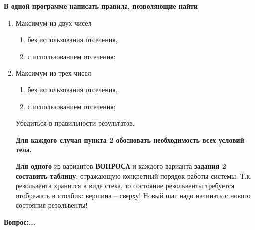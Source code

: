 \documentclass[a4paper,12pt]{article}
\begin{document}
	{\bf В одной программе написать правила, позволяющие найти}
	
	\begin{enumerate}
		\item Максимум из двух чисел
		
		\begin{enumerate}
			\item без использования отсечения,
			\item с использованием отсечения;
		\end{enumerate}
		\item Максимум из трех чисел
		
		\begin{enumerate}
			\item без использования отсечения,
			\item с использованием отсечения;
		\end{enumerate}

		Убедиться в правильности результатов.
		
		{\bf Для каждого случая пункта 2 обосновать необходимость всех условий тела.}
		
		{\bf Для одного} из вариантов {\bf ВОПРОСА} и каждого варианта {\bf задания 2 составить таблицу}, отражающую конкретный порядок работы системы: 
		Т.к. резольвента хранится в виде стека, то состояние резольвенты требуется отображать в столбик: \underline{вершина – сверху!} Новый шаг надо начинать с нового состояния резольвенты!
	\end{enumerate}
	
	{\bf Вопрос:...}
	
\end{document}
